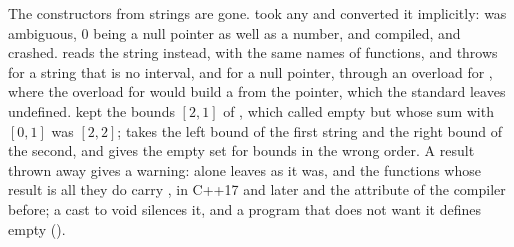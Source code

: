 \medskip
The constructors from strings are gone.\newinvfive{}  took any  and converted it implicitly:
 was ambiguous, 0 being a null pointer as well as a number,
and  compiled, and crashed. 
reads the string instead, with the same names of functions, and throws
 for a string that is no interval, and for a
null pointer, through an overload for , where the overload
for  would build a  from the pointer,
which the standard leaves undefined.  kept the bounds $[2, 1]$ of , which
 called empty but whose sum with $[0, 1]$ was $[2, 2]$;
 takes the left bound of the first string
and the right bound of the second, and gives the empty set for bounds in the
wrong order. A result thrown away gives a warning:  alone
leaves  as it was, and the functions whose result is all they do
carry , \code{[[nodiscard]]} in C++17 and later and
the attribute of the compiler before; a cast to void silences it, and a
program that does not want it defines  empty
().

